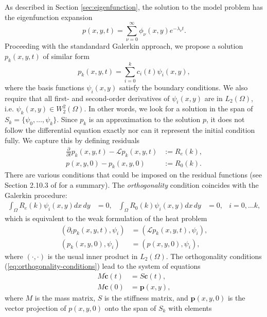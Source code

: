 \documentclass[10pt]{article}
\begin{document}
As described in Section \ref{sec:eigenfunction}, the solution to the
model problem has the eigenfunction expansion 
\[
  p(x,y,t) = \sum_{\nu=0}^\infty\phi_\nu(x,y) e^{-\lambda_\nu t}.
\]
Proceeding with the standandard Galerkin approach, we propose a
solution $p_{k}(x,y,t)$ of similar form
\[
  p_{k}(x,y,t) = \sum_{i=0}^k c_i(t) \psi_i(x,y),
\]
where the basis functions $\psi_i(x,y)$ satisfy the boundary
conditions. We also require that all first- and second-order
derivatives of $\psi_i(x,y)$ are in $L_2(\Omega)$, i.e.
$\psi_k(x,y) \in W_{2}^{2}(\Omega)$. In other words, we look for a
solution in the span of $S_k = \{\psi_0, \ldots, \psi_k\}$. Since
$p_k$ is an approximation to the solution $p$, it does not follow the
differential equation exactly nor can it represent the initial
condition fully. We capture this by defining residuals
\begin{align*}
  \frac{\partial}{\partial t} p_k(x,y,t) - \mathcal{L}p_k(x,y,t) &:= R_e(k), \\
  p(x,y,0) - p_k(x,y,0) &:= R_0(k).
\end{align*}
There are various conditions that could be imposed on the residual
functions (see Section 2.10.3 of \cite{norrie1973finite} for a
summary). The \textit{orthogonality} condition coincides with the
Galerkin procedure:
\begin{align}
  \displaystyle \int_{\Omega} R_e(k) \psi_i(x,y) dx\,dy &= 0,& \displaystyle \int_{\Omega} R_0(k) \psi_i(x,y) dx\,dy &= 0,& i = 0,\ldots k, \label{eq:orthogonality-conditions}
\end{align}
which is equivalent to the weak formulation of the heat problem
\begin{align*}
  \left( \partial_t p_k(x,y,t), \psi_i \right) &= \left(\mathcal{L}p_k(x,y,t), \psi_i \right), \\
  \left( p_k(x,y,0), \psi_i \right) &= \left(p(x,y,0), \psi_i\right),
\end{align*}
where $(\cdot, \cdot)$ is the usual inner product in
$L_2(\Omega)$. The orthogonality conditions
(\ref{eq:orthogonality-conditions}) lead to the system of equations
\begin{align*}
  M \mathbf{\dot{c}}(t) &= S \mathbf{c}(t), \\
  M \mathbf{c}(0) &= \mathbf{p}(x,y),
\end{align*}
where $M$ is the mass matrix, $S$ is the stiffness matrix, and
$\mathbf{p}(x,y,0)$ is the vector projection of $p(x,y,0)$ onto the
span of $S_k$ with elements
\end{document}
